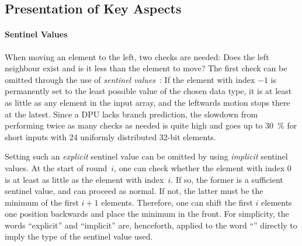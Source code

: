 \subsection{Presentation of Key Aspects}
\label{sec:tasklet:insertion:aspects}

\paragraph{Sentinel Values}
When moving an element to the left, two checks are needed:
Does the left neighbour exist and is it less than the element to move?
The first check can be omitted through the use of \emph{sentinel values}~\cite[93]{wirth1975algorithmen}:
If the element with index \(-1\) is permanently set to the least possible value of the chosen data type, it is at least as little as any element in the input array, and the leftwards motion stops there at the latest.
Since a \ac{DPU} lacks branch prediction, the slowdown from performing twice as many checks as needed is quite high and goes up to \qty{30}{\percent} for short inputs with 24 uniformly distributed 32-bit elements.

Setting such an \emph{explicit} sentinel value can be omitted by using \emph{implicit} sentinel values.
At the start of round~\(i\), one can check whether the element with index \(0\) is at least as little as the element with index~\(i\).
If so, the former is a sufficient sentinel value, and \IS{} can proceed as normal.
If not, the latter must be the minimum of the first \(i + 1\) elements.
Therefore, one can shift the first \(i\) elements one position backwards and place the minimum in the front.
For simplicity, the words \enquote{explicit} and \enquote{implicit} are, henceforth, applied to the word \enquote{\IS{}} directly to imply the type of the sentinel value used.
